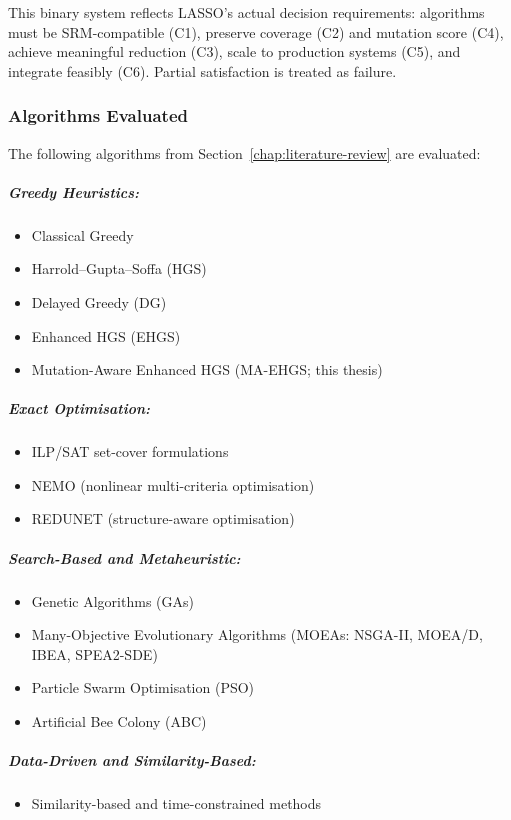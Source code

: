 \begin{appendices}
This binary system reflects LASSO's actual decision requirements: algorithms must be SRM-compatible (C1), preserve coverage (C2) and mutation score (C4), achieve meaningful reduction (C3), scale to production systems (C5), and integrate feasibly (C6). Partial satisfaction is treated as failure.

\subsubsection*{Algorithms Evaluated}

The following algorithms from Section~\ref{chap:literature-review} are evaluated:

\subparagraph{Greedy Heuristics:}
\begin{itemize}
  \item Classical Greedy
  \item Harrold--Gupta--Soffa (HGS)
  \item Delayed Greedy (DG)
  \item Enhanced HGS (EHGS)
  \item Mutation-Aware Enhanced HGS (MA-EHGS; this thesis)
\end{itemize}

\subparagraph{Exact Optimisation:}
\begin{itemize}
  \item ILP/SAT set-cover formulations
  \item NEMO (nonlinear multi-criteria optimisation)~\cite{lin2018}
  \item REDUNET (structure-aware optimisation)~\cite{mongiovi2020}
\end{itemize}

\subparagraph{Search-Based and Metaheuristic:}
\begin{itemize}
  \item Genetic Algorithms (GAs)
  \item Many-Objective Evolutionary Algorithms (MOEAs: NSGA-II, MOEA/D, IBEA, SPEA2-SDE)~\cite{wei2017}
  \item Particle Swarm Optimisation (PSO)~\cite{ahuja2024}
  \item Artificial Bee Colony (ABC)~\cite{ahuja2024}
\end{itemize}

\subparagraph{Data-Driven and Similarity-Based:}
\begin{itemize}
  \item Similarity-based and time-constrained methods~\cite{bach2017,khan2020}
\end{itemize}


\end{appendices}
